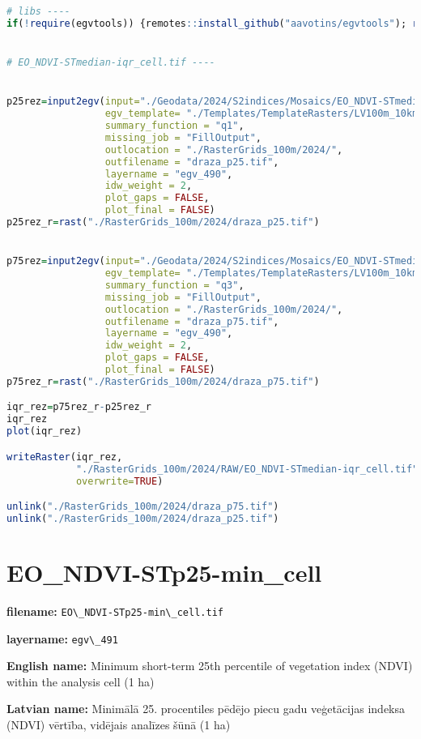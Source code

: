 \documentclass[
]{book}
\newcommand{\passthrough}[1]{#1}
\begin{document}
\begin{lstlisting}[language=R]
# libs ----
if(!require(egvtools)) {remotes::install_github("aavotins/egvtools"); require(egvtools)}


# EO_NDVI-STmedian-iqr_cell.tif ----


p25rez=input2egv(input="./Geodata/2024/S2indices/Mosaics/EO_NDVI-STmedian.tif",
                 egv_template= "./Templates/TemplateRasters/LV100m_10km.tif",
                 summary_function = "q1",
                 missing_job = "FillOutput",
                 outlocation = "./RasterGrids_100m/2024/",
                 outfilename = "draza_p25.tif",
                 layername = "egv_490",
                 idw_weight = 2,
                 plot_gaps = FALSE,
                 plot_final = FALSE)
p25rez_r=rast("./RasterGrids_100m/2024/draza_p25.tif")


p75rez=input2egv(input="./Geodata/2024/S2indices/Mosaics/EO_NDVI-STmedian.tif",
                 egv_template= "./Templates/TemplateRasters/LV100m_10km.tif",
                 summary_function = "q3",
                 missing_job = "FillOutput",
                 outlocation = "./RasterGrids_100m/2024/",
                 outfilename = "draza_p75.tif",
                 layername = "egv_490",
                 idw_weight = 2,
                 plot_gaps = FALSE,
                 plot_final = FALSE)
p75rez_r=rast("./RasterGrids_100m/2024/draza_p75.tif")

iqr_rez=p75rez_r-p25rez_r
iqr_rez
plot(iqr_rez)

writeRaster(iqr_rez,
            "./RasterGrids_100m/2024/RAW/EO_NDVI-STmedian-iqr_cell.tif",
            overwrite=TRUE)

unlink("./RasterGrids_100m/2024/draza_p75.tif")
unlink("./RasterGrids_100m/2024/draza_p25.tif")
\end{lstlisting}

\section{EO\_NDVI-STp25-min\_cell}\label{ch06.491}

\textbf{filename:} \passthrough{\lstinline!EO\_NDVI-STp25-min\_cell.tif!}

\textbf{layername:} \passthrough{\lstinline!egv\_491!}

\textbf{English name:} Minimum short-term 25th percentile of vegetation index (NDVI) within the analysis cell (1 ha)

\textbf{Latvian name:} Minimālā 25. procentiles pēdējo piecu gadu veģetācijas indeksa (NDVI) vērtība, vidējais analīzes šūnā (1 ha)
\end{document}
